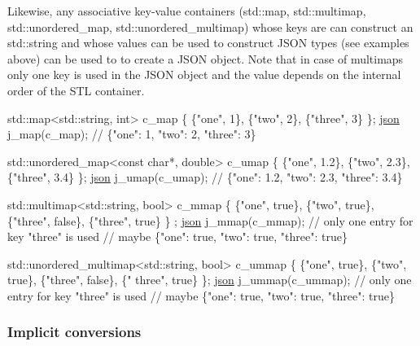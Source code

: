Likewise, any associative key-\/value containers ({\ttfamily std\+::map}, {\ttfamily std\+::multimap}, {\ttfamily std\+::unordered\+\_\+map}, {\ttfamily std\+::unordered\+\_\+multimap}) whose keys are can construct an {\ttfamily std\+::string} and whose values can be used to construct J\+S\+ON types (see examples above) can be used to to create a J\+S\+ON object. Note that in case of multimaps only one key is used in the J\+S\+ON object and the value depends on the internal order of the S\+TL container.


\begin{DoxyCode}
std::map<std::string, int> c\_map \{ \{\textcolor{stringliteral}{"one"}, 1\}, \{\textcolor{stringliteral}{"two"}, 2\}, \{\textcolor{stringliteral}{"three"}, 3\} \};
\hyperlink{a00025}{json} j\_map(c\_map);
\textcolor{comment}{// \{"one": 1, "two": 2, "three": 3\}}

std::unordered\_map<const char*, double> c\_umap \{ \{\textcolor{stringliteral}{"one"}, 1.2\}, \{\textcolor{stringliteral}{"two"}, 2.3\}, \{\textcolor{stringliteral}{"three"}, 3.4\} \};
\hyperlink{a00025}{json} j\_umap(c\_umap);
\textcolor{comment}{// \{"one": 1.2, "two": 2.3, "three": 3.4\}}

std::multimap<std::string, bool> c\_mmap \{ \{\textcolor{stringliteral}{"one"}, \textcolor{keyword}{true}\}, \{\textcolor{stringliteral}{"two"}, \textcolor{keyword}{true}\}, \{\textcolor{stringliteral}{"three"}, \textcolor{keyword}{false}\}, \{\textcolor{stringliteral}{"three"}, \textcolor{keyword}{true}\} \}
      ;
\hyperlink{a00025}{json} j\_mmap(c\_mmap); \textcolor{comment}{// only one entry for key "three" is used}
\textcolor{comment}{// maybe \{"one": true, "two": true, "three": true\}}

std::unordered\_multimap<std::string, bool> c\_ummap \{ \{\textcolor{stringliteral}{"one"}, \textcolor{keyword}{true}\}, \{\textcolor{stringliteral}{"two"}, \textcolor{keyword}{true}\}, \{\textcolor{stringliteral}{"three"}, \textcolor{keyword}{false}\}, \{\textcolor{stringliteral}{"
      three"}, \textcolor{keyword}{true}\} \};
\hyperlink{a00025}{json} j\_ummap(c\_ummap); \textcolor{comment}{// only one entry for key "three" is used}
\textcolor{comment}{// maybe \{"one": true, "two": true, "three": true\}}
\end{DoxyCode}


\subsubsection*{Implicit conversions}

